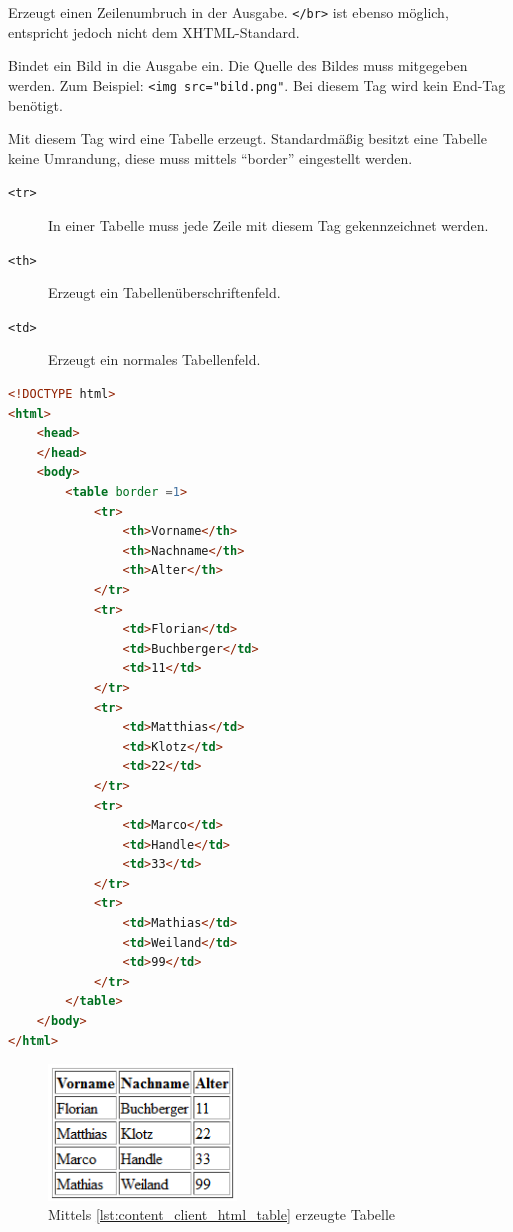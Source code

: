 \begin{description} [style=nextline]
	\item[\texttt{<br />}] Erzeugt einen Zeilenumbruch in der Ausgabe. \texttt{</br>} ist ebenso möglich, entspricht jedoch nicht dem XHTML-Standard.
	\item[\texttt{<img>}] Bindet ein Bild in die Ausgabe ein. Die Quelle des Bildes muss mitgegeben werden. Zum Beispiel: \texttt{<img src="bild.png"}. Bei diesem Tag wird kein 	End-Tag benötigt.
	\item[\texttt{<table>}] Mit diesem Tag wird eine Tabelle erzeugt. Standardmäßig besitzt eine Tabelle keine Umrandung, diese muss mittels \enquote{border} eingestellt werden.
	\begin{description}
		\item[\texttt{<tr>}] In einer Tabelle muss jede Zeile mit diesem Tag gekennzeichnet werden.
		\item[\texttt{<th>}] Erzeugt ein Tabellenüberschriftenfeld.
		\item[\texttt{<td>}] Erzeugt ein normales Tabellenfeld.
	\end{description}
\end{description}
\newpage
\begin{lstlisting}[style=custom, language=HTML, caption={HTML-Tabelle}, label={lst:content_client_html_table}]
<!DOCTYPE html>
<html>
	<head>
	</head>
	<body>
		<table border =1> 
			<tr>
				<th>Vorname</th>
				<th>Nachname</th>
				<th>Alter</th>
			</tr>
			<tr>
				<td>Florian</td>
				<td>Buchberger</td>
				<td>11</td>
			</tr>
			<tr>
				<td>Matthias</td>
				<td>Klotz</td>
				<td>22</td>
			</tr>
			<tr>
				<td>Marco</td>
				<td>Handle</td>
				<td>33</td>
			</tr>
			<tr>
				<td>Mathias</td>
				<td>Weiland</td>
				<td>99</td>
			</tr>
		</table>
	</body>
</html>
\end{lstlisting}

\begin{figure}[H]
\centering
\includegraphics[keepaspectratio=true, width=5cm]{images/screenshots/html_table.png}
\caption{Mittels \autoref{lst:content_client_html_table} erzeugte Tabelle}
\label{fig:content_html_table}
\end{figure}

